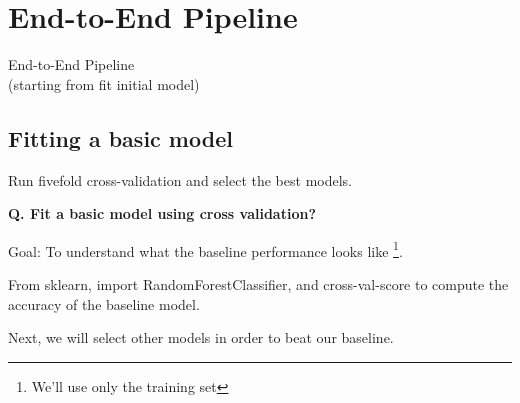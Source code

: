 \section{End-to-End Pipeline}
\begin{transitionframe}
  \begin{center}
    \Huge End-to-End Pipeline\\(starting from fit initial model)
  \end{center}
\end{transitionframe}

\subsection{Fitting a basic model}
\begin{transitionsubframe}
  \begin{center}
    \Huge Run fivefold cross-validation and select the best models.
  \end{center}
\end{transitionsubframe}

\begin{frame}[fragile]{\textbf{Q. Fit a basic model using cross validation?}}
  \begin{wideitemize}
    \item Goal: To understand what the baseline performance looks like
    \footnote{We'll use only the training set}.
    \begin{wideitemize}
      \item From sklearn, import RandomForestClassifier, and cross-val-score
      to compute the accuracy of the baseline model.
    \end{wideitemize}
    \item Next, we will select other models in order to beat our baseline.
  \end{wideitemize}
\end{frame}

